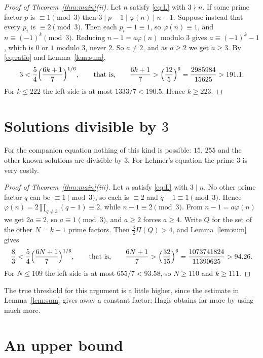 \documentclass[11pt]{amsart}
\theoremstyle{definition}
\theoremstyle{remark}
\begin{document}
\begin{proof}[Proof of Theorem~\ref{thm:main}(ii)]
Let $n$ satisfy \eqref{eq:L} with $3\nmid n$. If some prime factor $p$ is
$\equiv1\pmod3$ then $3\mid p-1\mid\varphi(n)\mid n-1$. Suppose instead
that every $p_i$ is $\equiv2\pmod3$. Then each $p_i-1\equiv1$, so
$\varphi(n)\equiv1$, and $n\equiv(-1)^{k}\pmod3$. Reducing
$n-1=a\varphi(n)$ modulo $3$ gives $a\equiv(-1)^{k}-1$, which is $0$ or
$1$ modulo $3$, never $2$. So $a\ne2$, and as $a\ge2$ we get $a\ge3$. By
\eqref{eq:ratio} and Lemma~\ref{lem:sum},
\[
  3<\frac54\Bigl(\frac{6k+1}{7}\Bigr)^{1/6},\qquad\text{that is,}\qquad
  \frac{6k+1}{7}>\Bigl(\frac{12}{5}\Bigr)^{6}=\frac{2985984}{15625}>191.1 .
\]
For $k\le222$ the left side is at most $1333/7<190.5$. Hence $k\ge223$.
\end{proof}

\section{Solutions divisible by \texorpdfstring{$3$}{3}}

For the companion equation nothing of this kind is possible: $15$,
$255$ and the other known solutions are divisible by $3$. For Lehmer's
equation the prime $3$ is very costly.

\begin{proof}[Proof of Theorem~\ref{thm:main}(iii)]
Let $n$ satisfy \eqref{eq:L} with $3\mid n$. No other prime factor $q$
can be $\equiv1\pmod3$, so each is $\equiv2$ and $q-1\equiv1\pmod3$.
Hence $\varphi(n)=2\prod_{q\ne3}(q-1)\equiv2$, while $n-1\equiv2\pmod 3$.
From $n-1=a\varphi(n)$ we get $2a\equiv2$, so $a\equiv1\pmod3$, and
$a\ge2$ forces $a\ge4$. Write $Q$ for the set of the other $N=k-1$ prime
factors. Then $\frac32\Pi(Q)>4$, and Lemma~\ref{lem:sum} gives
\[
  \frac83<\frac54\Bigl(\frac{6N+1}{7}\Bigr)^{1/6},\qquad\text{that is,}\qquad
  \frac{6N+1}{7}>\Bigl(\frac{32}{15}\Bigr)^{6}=\frac{1073741824}{11390625}>94.26 .
\]
For $N\le109$ the left side is at most $655/7<93.58$, so $N\ge110$ and
$k\ge111$.
\end{proof}

The true threshold for this argument is a little higher, since the
estimate in Lemma~\ref{lem:sum} gives away a constant factor; Hagis
\cite{Hag88} obtains far more by using much more.

\section{An upper bound}
\end{document}
